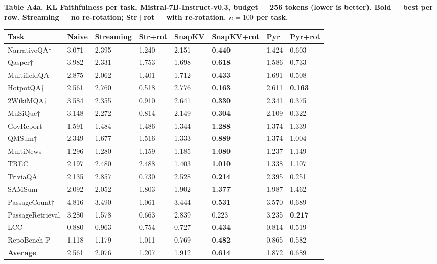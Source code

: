 \documentclass[10pt,letterpaper]{article}
\begin{document}
\textbf{Table A4a. KL Faithfulness per task, Mistral-7B-Instruct-v0.3,
budget = 256 tokens (lower is better). Bold = best per row.
Streaming = no re-rotation; Str+rot = with re-rotation.
$n = 100$ per task.}

\begin{table}[H]
\centering
\small
\begin{tabular}{@{}llllllll@{}}
\toprule
Task & Naive & Streaming & Str+rot & SnapKV & SnapKV+rot & Pyr &
Pyr+rot\\
\midrule
NarrativeQA† & 3.071 & 2.395 & 1.240 & 2.151 & \textbf{0.440} & 1.424 &
0.603\\
Qasper† & 3.982 & 2.331 & 1.753 & 1.698 & \textbf{0.618} & 1.586 &
0.733\\
MultifieldQA & 2.875 & 2.062 & 1.401 & 1.712 & \textbf{0.433} & 1.691 &
0.508\\
HotpotQA† & 2.561 & 2.760 & 0.518 & 2.776 & \textbf{0.163} & 2.611 &
\textbf{0.163}\\
2WikiMQA† & 3.584 & 2.355 & 0.910 & 2.641 & \textbf{0.330} & 2.341 &
0.375\\
MuSiQue† & 3.148 & 2.272 & 0.814 & 2.149 & \textbf{0.304} & 2.109 &
0.322\\
GovReport & 1.591 & 1.484 & 1.486 & 1.344 & \textbf{1.288} & 1.374 &
1.339\\
QMSum† & 2.349 & 1.677 & 1.516 & 1.333 & \textbf{0.889} & 1.374 &
1.004\\
MultiNews & 1.296 & 1.280 & 1.159 & 1.185 & \textbf{1.080} & 1.237 &
1.149\\
TREC & 2.197 & 2.480 & 2.488 & 1.403 & \textbf{1.010} & 1.338 &
1.107\\
TriviaQA & 2.135 & 2.857 & 0.730 & 2.528 & \textbf{0.214} & 2.395 &
0.251\\
SAMSum & 2.092 & 2.052 & 1.803 & 1.902 & \textbf{1.377} & 1.987 &
1.462\\
PassageCount† & 4.816 & 3.490 & 1.061 & 3.444 & \textbf{0.531} & 3.570 &
0.689\\
PassageRetrieval & 3.280 & 1.578 & 0.663 & 2.839 & 0.223 & 3.235 &
\textbf{0.217}\\
LCC & 0.880 & 0.963 & 0.754 & 0.727 & \textbf{0.434} & 0.814 &
0.519\\
RepoBench-P & 1.118 & 1.179 & 1.011 & 0.769 & \textbf{0.482} & 0.865 &
0.582\\
\textbf{Average} & 2.561 & 2.076 & 1.207 & 1.912 & \textbf{0.614} & 1.872 &
0.689\\
\bottomrule
\end{tabular}
\end{table}
\end{document}
